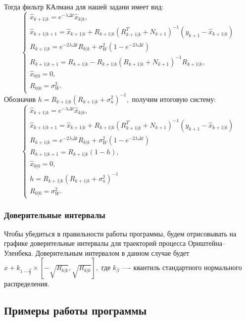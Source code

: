 \documentclass[11pt]{article}
\numberwithin{equation}{section}
\begin{document}
Тогда фильтр КАлмана для нашей задани имеет вид:
\begin{equation*}
  \begin{cases}
    \hat{x}_{k+1|k} = e^{-\lambda\Delta t} \hat{x}_{k|k},\\
    \hat{x}_{k+1|k+1} = \hat{x}_{k+1|k}+R_{k+1|k}(R_{k+1|k}^T +N_{k+1})^{-1} (y_{k+1}- \hat{x}_{k+1|k})\\
    R_{k+1|k} = e^{-2\lambda\Delta t}R_{k|k} + \sigma_W^2(1-e^{-2\lambda \Delta t})\\
    R_{k+1|k+1} =  R_{k+1|k} -  R_{k+1|k}( R_{k+1|k} +N_{k+1})^{-1} R_{k+1|k},\\
    \hat{x}_{0|0} = 0,\\
    R_{0|0} = \sigma_W^2.
  \end{cases}
\end{equation*}
Обозначив $h = R_{k+1|k}(R_{k+1|k}+\sigma_n^2)^{-1},$ получим итоговую систему:
\begin{equation*}
  \begin{cases}
    \hat{x}_{k+1|k} = e^{-\lambda\Delta t} \hat{x}_{k|k},\\
    \hat{x}_{k+1|k+1} = \hat{x}_{k+1|k}+R_{k+1|k}(R_{k+1|k}^T +N_{k+1})^{-1} (y_{k+1}- \hat{x}_{k+1|k})\\
    R_{k+1|k} = e^{-2\lambda\Delta t}R_{k|k} + \sigma_W^2(1-e^{-2\lambda \Delta t})\\
    R_{k+1|k+1} =  R_{k+1|k}(1-h),\\
    \hat{x}_{0|0} = 0,\\
    h = R_{k+1|k}(R_{k+1|k}+\sigma_n^2)^{-1} \\
    R_{0|0} = \sigma_W^2.
  \end{cases}
\end{equation*}
\subsubsection{Доверительные интервалы}

Чтобы убедиться в правильности работы программы, будем отрисовывать на графике
доверительные интервалы для траекторий процесса Орнштейна–Уленбека. Доверительным интервалом в данном случае будет
 $\hat{x} + k_{1-\frac{\beta}{2}} \times [-\sqrt{R_{k|k}}, \sqrt{R_{k|k}}],$ где $k_{\beta}$ —- квантиль
стандартного нормального распределения.
\subsection{Примеры работы программы}
\end{document}

